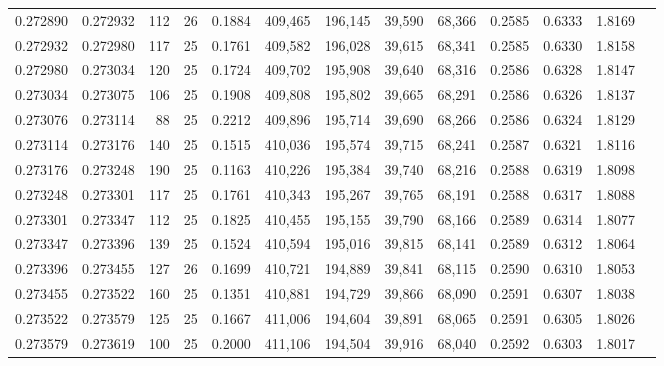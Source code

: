 \begin{tabular}{rrrrrrrrrrrrr}
0.272890 & 0.272932 &   112 &  26 &                                     0.1884 & 409,465 & 196,145 &  39,590 &  68,366 & 0.2585 & 0.6333 & 1.8169 \\
0.272932 & 0.272980 &   117 &  25 &                                     0.1761 & 409,582 & 196,028 &  39,615 &  68,341 & 0.2585 & 0.6330 & 1.8158 \\
0.272980 & 0.273034 &   120 &  25 &                                     0.1724 & 409,702 & 195,908 &  39,640 &  68,316 & 0.2586 & 0.6328 & 1.8147 \\
0.273034 & 0.273075 &   106 &  25 &                                     0.1908 & 409,808 & 195,802 &  39,665 &  68,291 & 0.2586 & 0.6326 & 1.8137 \\
0.273076 & 0.273114 &    88 &  25 &                                     0.2212 & 409,896 & 195,714 &  39,690 &  68,266 & 0.2586 & 0.6324 & 1.8129 \\
0.273114 & 0.273176 &   140 &  25 &                                     0.1515 & 410,036 & 195,574 &  39,715 &  68,241 & 0.2587 & 0.6321 & 1.8116 \\
0.273176 & 0.273248 &   190 &  25 &                                     0.1163 & 410,226 & 195,384 &  39,740 &  68,216 & 0.2588 & 0.6319 & 1.8098 \\
0.273248 & 0.273301 &   117 &  25 &                                     0.1761 & 410,343 & 195,267 &  39,765 &  68,191 & 0.2588 & 0.6317 & 1.8088 \\
0.273301 & 0.273347 &   112 &  25 &                                     0.1825 & 410,455 & 195,155 &  39,790 &  68,166 & 0.2589 & 0.6314 & 1.8077 \\
0.273347 & 0.273396 &   139 &  25 &                                     0.1524 & 410,594 & 195,016 &  39,815 &  68,141 & 0.2589 & 0.6312 & 1.8064 \\
0.273396 & 0.273455 &   127 &  26 &                                     0.1699 & 410,721 & 194,889 &  39,841 &  68,115 & 0.2590 & 0.6310 & 1.8053 \\
0.273455 & 0.273522 &   160 &  25 &                                     0.1351 & 410,881 & 194,729 &  39,866 &  68,090 & 0.2591 & 0.6307 & 1.8038 \\
0.273522 & 0.273579 &   125 &  25 &                                     0.1667 & 411,006 & 194,604 &  39,891 &  68,065 & 0.2591 & 0.6305 & 1.8026 \\
0.273579 & 0.273619 &   100 &  25 &                                     0.2000 & 411,106 & 194,504 &  39,916 &  68,040 & 0.2592 & 0.6303 & 1.8017 \\

\end{tabular}
